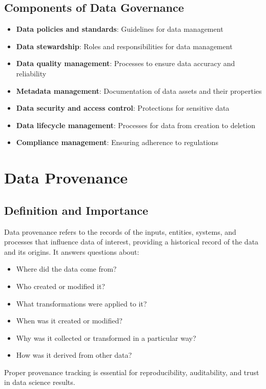 \documentclass[12pt]{article}
\begin{document}
\subsection{Components of Data Governance}
\begin{itemize}
    \item \textbf{Data policies and standards}: Guidelines for data management
    \item \textbf{Data stewardship}: Roles and responsibilities for data management
    \item \textbf{Data quality management}: Processes to ensure data accuracy and reliability
    \item \textbf{Metadata management}: Documentation of data assets and their properties
    \item \textbf{Data security and access control}: Protections for sensitive data
    \item \textbf{Data lifecycle management}: Processes for data from creation to deletion
    \item \textbf{Compliance management}: Ensuring adherence to regulations
\end{itemize}

\section{Data Provenance}

\subsection{Definition and Importance}
\begin{tcolorbox}[colback=yellow!5!white,colframe=yellow!75!black,title={Data Provenance}]
Data provenance refers to the records of the inputs, entities, systems, and processes that influence data of interest, providing a historical record of the data and its origins. It answers questions about:

\begin{itemize}
    \item Where did the data come from?
    \item Who created or modified it?
    \item What transformations were applied to it?
    \item When was it created or modified?
    \item Why was it collected or transformed in a particular way?
    \item How was it derived from other data?
\end{itemize}

Proper provenance tracking is essential for reproducibility, auditability, and trust in data science results.
\end{tcolorbox}
\end{document}
